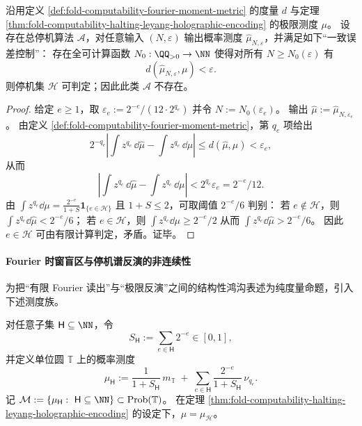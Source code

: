 \begin{corollary}[全息边界的统一误差控制学习不可能]\label{cor:fold-computability-halting-no-uniform-learning}
沿用定义 \ref{def:fold-computability-fourier-moment-metric} 的度量 \(d\) 与定理 \ref{thm:fold-computability-halting-leyang-holographic-encoding} 的极限测度 \(\mu\)。
设存在总停机算法 \(\mathcal A\)，对任意输入 \((N,\varepsilon)\) 输出概率测度 \(\widehat{\mu}_{N,\varepsilon}\)，并满足如下“一致误差控制”：
存在全可计算函数 \(N_0:\QQ_{>0}\to\NN\) 使得对所有 \(N\ge N_0(\varepsilon)\) 有
\[
d(\widehat{\mu}_{N,\varepsilon},\mu)<\varepsilon.
\]
则停机集 \(\mathcal H\) 可判定；因此此类 \(\mathcal A\) 不存在。
\end{corollary}
\begin{proof}
给定 \(e\ge 1\)，取
\(
\varepsilon_e:=2^{-e}/(12\cdot 2^{q_e})
\)
并令 \(N:=N_0(\varepsilon_e)\)。
输出 \(\widehat{\mu}:=\widehat{\mu}_{N,\varepsilon_e}\)。
由定义 \ref{def:fold-computability-fourier-moment-metric}，第 \(q_e\) 项给出
\[
2^{-q_e}\left|\int z^{q_e}\,\dd\widehat{\mu}-\int z^{q_e}\,\dd\mu\right|
\le d(\widehat{\mu},\mu)
<\varepsilon_e,
\]
从而
\[
\left|\int z^{q_e}\,\dd\widehat{\mu}-\int z^{q_e}\,\dd\mu\right|
<2^{q_e}\varepsilon_e
=2^{-e}/12.
\]
由 \(\int z^{q_e}\dd\mu=\frac{2^{-e}}{1+S}\mathbf 1_{\{e\in\mathcal H\}}\) 且 \(1+S\le 2\)，可取阈值 \(2^{-e}/6\) 判别：
若 \(e\notin\mathcal H\)，则 \(\int z^{q_e}\dd\widehat{\mu}<2^{-e}/6\)；
若 \(e\in\mathcal H\)，则 \(\int z^{q_e}\dd\mu\ge 2^{-e}/2\) 从而 \(\int z^{q_e}\dd\widehat{\mu}>2^{-e}/6\)。
因此 \(e\in\mathcal H\) 可由有限计算判定，矛盾。证毕。
\end{proof}

\paragraph{Fourier 时窗盲区与停机谱反演的非连续性}
为把“有限 Fourier 读出”与“极限反演”之间的结构性鸿沟表述为纯度量命题，引入下述测度族。

\begin{definition}\label{def:fold-computability-leyang-halting-spectrum-measure-family}
对任意子集 \(\mathsf H\subseteq\NN\)，令
\[
S_{\mathsf H}:=\sum_{e\in\mathsf H}2^{-e}\in[0,1],
\]
并定义单位圆 \(\mathbb T\) 上的概率测度
\[
\mu_{\mathsf H}
:=
\frac{1}{1+S_{\mathsf H}}\,m_{\mathbb T}
\;+\;
\sum_{e\in\mathsf H}\frac{2^{-e}}{1+S_{\mathsf H}}\,\nu_{q_e}.
\]
记
\(
\mathcal M:=\{\mu_{\mathsf H}:\ \mathsf H\subseteq\NN\}\subset\mathrm{Prob}(\mathbb T)
\)。
在定理 \ref{thm:fold-computability-halting-leyang-holographic-encoding} 的设定下，\(\mu=\mu_{\mathcal H}\)。
\end{definition}

